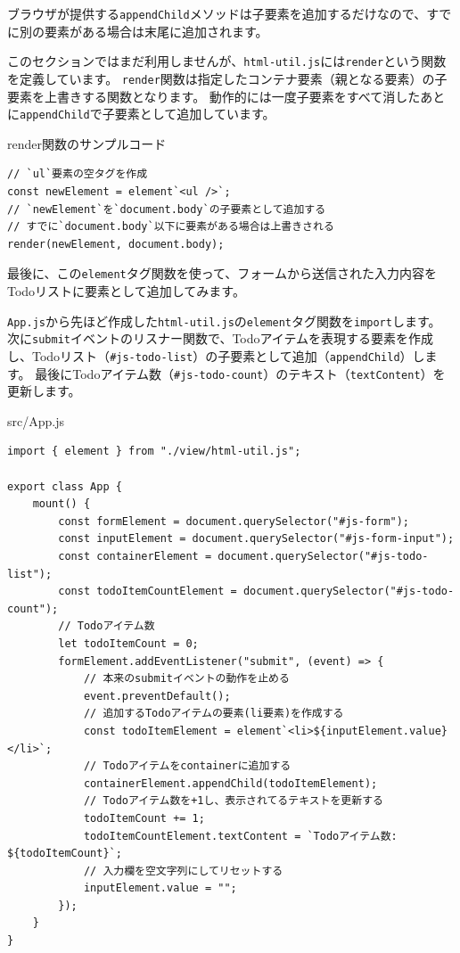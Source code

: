 ブラウザが提供する\texttt{appendChild}メソッドは子要素を追加するだけなので、すでに別の要素がある場合は末尾に追加されます。

このセクションではまだ利用しませんが、\texttt{html-util.js}には\texttt{render}という関数を定義しています。
\texttt{render}関数は指定したコンテナ要素（親となる要素）の子要素を上書きする関数となります。
動作的には一度子要素をすべて消したあとに\texttt{appendChild}で子要素として追加しています。

\begin{listtitle}
render関数のサンプルコード
\end{listtitle}
\begin{lstlisting}
// `ul`要素の空タグを作成
const newElement = element`<ul />`;
// `newElement`を`document.body`の子要素として追加する
// すでに`document.body`以下に要素がある場合は上書きされる
render(newElement, document.body);
\end{lstlisting}
\listend

最後に、この\texttt{element}タグ関数を使って、フォームから送信された入力内容をTodoリストに要素として追加してみます。

\texttt{App.js}から先ほど作成した\texttt{html-util.js}の\texttt{element}タグ関数を\texttt{import}します。
次に\texttt{submit}イベントのリスナー関数で、Todoアイテムを表現する要素を作成し、Todoリスト（\texttt{\#js-todo-list}）の子要素として追加（\texttt{appendChild}）します。
最後にTodoアイテム数（\texttt{\#js-todo-count}）のテキスト（\texttt{textContent}）を更新します。

\begin{listtitle}
src/App.js
\end{listtitle}
\begin{lstlisting}
import { element } from "./view/html-util.js";

export class App {
    mount() {
        const formElement = document.querySelector("#js-form");
        const inputElement = document.querySelector("#js-form-input");
        const containerElement = document.querySelector("#js-todo-list");
        const todoItemCountElement = document.querySelector("#js-todo-count");
        // Todoアイテム数
        let todoItemCount = 0;
        formElement.addEventListener("submit", (event) => {
            // 本来のsubmitイベントの動作を止める
            event.preventDefault();
            // 追加するTodoアイテムの要素(li要素)を作成する
            const todoItemElement = element`<li>${inputElement.value}</li>`;
            // Todoアイテムをcontainerに追加する
            containerElement.appendChild(todoItemElement);
            // Todoアイテム数を+1し、表示されてるテキストを更新する
            todoItemCount += 1;
            todoItemCountElement.textContent = `Todoアイテム数: ${todoItemCount}`;
            // 入力欄を空文字列にしてリセットする
            inputElement.value = "";
        });
    }
}
\end{lstlisting}
\listend

